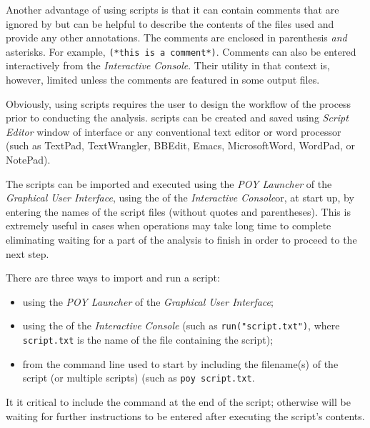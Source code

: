 Another advantage of using scripts is that it can contain comments that are ignored by \poy but can be helpful to describe the contents of the files used and provide any other annotations. The comments are enclosed in parenthesis \emph{and} asterisks. For example, \texttt{(*this is a comment*)}. Comments can also be entered interactively from the \emph{Interactive Console}. Their utility in that context is, however, limited unless the comments are featured in some output files.

Obviously, using scripts requires the user to design the workflow of the process prior to conducting the analysis. \poy scripts can be created and saved using \emph{Script Editor} window of \poy interface or any conventional text editor or word processor (such as TextPad, TextWrangler, BBEdit, Emacs, MicrosoftWord, WordPad, or NotePad).

The scripts can be imported and executed using the \emph{POY Launcher} of the \emph{Graphical User Interface}, using the  of the \emph{Interactive Console}or, at start up, by entering the names of the script files (without quotes and parentheses). This is extremely useful in cases when operations may take long time to complete eliminating waiting for a part of the analysis to finish in order to proceed to the next step.

There are three ways to import and run a script:
\begin{itemize}
    \item using the \emph{POY Launcher} of the \emph{Graphical User Interface};
    \item using the  of the \emph{Interactive Console} (such as \texttt{run("script.txt")}, where \texttt{script.txt} is the name of the file containing the script);
   \item from the command line used to start \poy by including the filename(s) of the script (or multiple scripts) (such as \texttt{poy script.txt}.
\end{itemize}

It it critical to include the command  at the end of the script; otherwise \poy will be waiting for further instructions to be entered after executing the script's contents.

